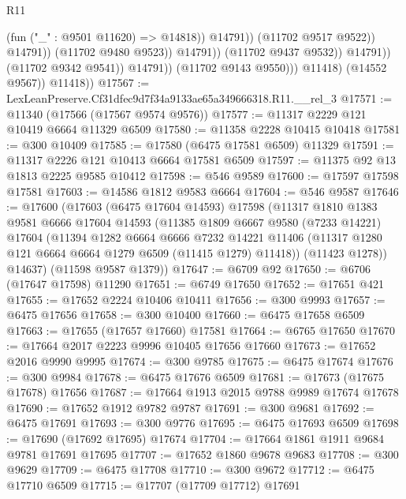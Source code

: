 \begin{lexlean}{R11}
\begin{coremodule}
                                              (fun ("_" : @9501 @11620) => @14818))
                                            @14791))
                                        (@11702 @9517 @9522))
                                      @14791))
                                  (@11702 @9480 @9523))
                                @14791))
                            (@11702 @9437 @9532))
                          @14791))
                      (@11702 @9342 @9541))
                    @14791))
                (@11702 @9143 @9550)))
            @11418)
          (@14552 @9567))
        @11418))
@17567 := LexLeanPreserve.Cf31dfec9d7f34a9133ae65a349666318.R11.__rel_3
@17571 := @11340 (@17566 (@17567 @9574 @9576))
@17577 := @11317 @2229 @121 @10419 @6664 @11329 @6509
@17580 := @11358 @2228 @10415 @10418
@17581 := @300 @10409
@17585 := @17580 (@6475 @17581 @6509) @11329
@17591 := @11317 @2226 @121 @10413 @6664 @17581 @6509
@17597 := @11375 @92 @13 @1813 @2225 @9585 @10412
@17598 := @546 @9589
@17600 := @17597 @17598 @17581
@17603 := @14586 @1812 @9583 @6664
@17604 := @546 @9587
@17646 := @17600
    (@17603
      (@6475 @17604 @14593)
      @17598
      (@11317
        @1810
        @1383
        @9581
        @6666
        @17604
        @14593
        (@11385
          @1809
          @6667
          @9580
          (@7233 @14221)
          @17604
          (@11394
            @1282
            @6664
            @6666
            @7232
            @14221
            @11406
            (@11317 @1280 @121 @6664 @6664 @1279 @6509 (@11415 @1279) @11418))
          (@11423 @1278))
        @14637)
      (@11598 @9587 @1379))
@17647 := @6709 @92
@17650 := @6706 (@17647 @17598) @11290
@17651 := @6749 @17650
@17652 := @17651 @421
@17655 := @17652 @2224 @10406 @10411
@17656 := @300 @9993
@17657 := @6475 @17656
@17658 := @300 @10400
@17660 := @6475 @17658 @6509
@17663 := @17655 (@17657 @17660) @17581
@17664 := @6765 @17650
@17670 := @17664 @2017 @2223 @9996 @10405 @17656 @17660
@17673 := @17652 @2016 @9990 @9995
@17674 := @300 @9785
@17675 := @6475 @17674
@17676 := @300 @9984
@17678 := @6475 @17676 @6509
@17681 := @17673 (@17675 @17678) @17656
@17687 := @17664 @1913 @2015 @9788 @9989 @17674 @17678
@17690 := @17652 @1912 @9782 @9787
@17691 := @300 @9681
@17692 := @6475 @17691
@17693 := @300 @9776
@17695 := @6475 @17693 @6509
@17698 := @17690 (@17692 @17695) @17674
@17704 := @17664 @1861 @1911 @9684 @9781 @17691 @17695
@17707 := @17652 @1860 @9678 @9683
@17708 := @300 @9629
@17709 := @6475 @17708
@17710 := @300 @9672
@17712 := @6475 @17710 @6509
@17715 := @17707 (@17709 @17712) @17691

\end{coremodule}
\end{lexlean}
